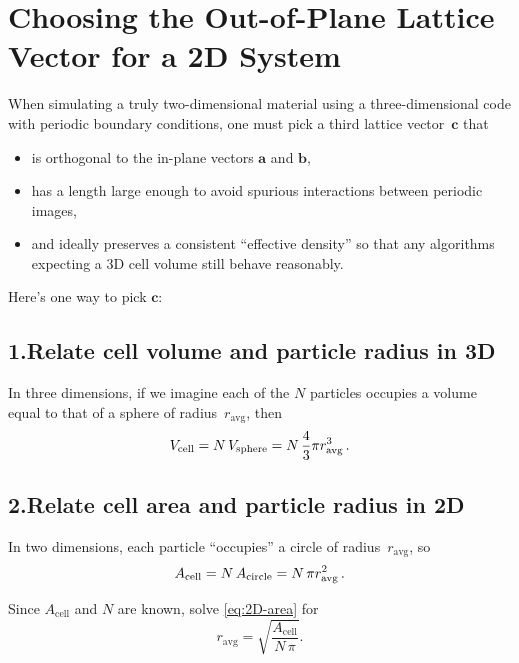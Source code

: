 \documentclass{article}
\begin{document}
\section*{Choosing the Out-of-Plane Lattice Vector for a 2D System}

When simulating a truly two-dimensional material using a three-dimensional code with periodic boundary conditions, one must pick a third lattice vector~$\mathbf{c}$ that

\begin{itemize}
  \item is orthogonal to the in-plane vectors $\mathbf{a}$ and $\mathbf{b}$,
  \item has a length large enough to avoid spurious interactions between periodic images,
  \item and ideally preserves a consistent “effective density” so that any algorithms expecting a 3D cell volume still behave reasonably.
\end{itemize}

Here’s one way to pick $\mathbf{c}$:

\subsection*{1.\quad Relate cell volume and particle radius in 3D}

In three dimensions, if we imagine each of the $N$ particles occupies a volume equal to that of a sphere of radius~$r_\mathrm{avg}$, then
\begin{equation}
  V_\mathrm{cell}
  = N \, V_{\rm sphere}
  = N \,\frac{4}{3}\pi r_\mathrm{avg}^3
  \,.
  \label{eq:3D-volume}
\end{equation}

\subsection*{2.\quad Relate cell area and particle radius in 2D}

In two dimensions, each particle “occupies” a circle of radius~$r_\mathrm{avg}$, so
\begin{equation}
  A_\mathrm{cell}
  = N \, A_{\rm circle}
  = N \,\pi r_\mathrm{avg}^2
  \,.
  \label{eq:2D-area}
\end{equation}

Since $A_\mathrm{cell}$ and $N$ are known, solve \eqref{eq:2D-area} for
\begin{equation}
  r_\mathrm{avg}
  = \sqrt{\frac{A_\mathrm{cell}}{N\,\pi}}.
  \label{eq:r-avg}
\end{equation}
\end{document}
